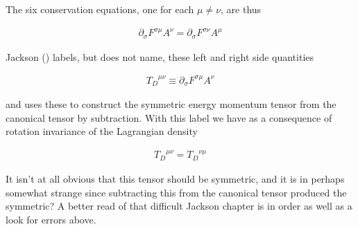 The six conservation equations, one for each $\mu \ne \nu$, are thus

\begin{align}\label{eqn:maxwellLagRot:goo12}
\partial_\sigma F^{\sigma\mu} A^\nu = \partial_\sigma F^{\sigma\nu} A^\mu
\end{align}

Jackson (\cite{jackson1975cew}) labels, but does not name, these left and right side quantities

\begin{align}\label{eqn:maxwellLagRot:goo13}
{T_D}^{\mu\nu} \equiv \partial_\sigma F^{\sigma\mu} A^\nu
\end{align}

and uses these to construct the symmetric energy momentum tensor from the canonical tensor by subtraction.  With this label we have as a consequence of rotation invariance of the Lagrangian density

\begin{align}\label{eqn:maxwellLagRot:goo14}
{T_D}^{\mu\nu} = {T_D}^{\nu\mu}
\end{align}

It isn't at all obvious that this tensor should be symmetric, and it is in perhaps somewhat strange since subtracting this from the canonical tensor produced the symmetric?  A better read of that difficult Jackson chapter is in order as well as a look for errors above.

\EndArticle
